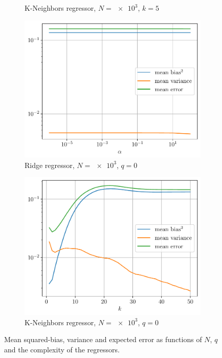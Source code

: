 \documentclass[a4paper, 12pt]{article}
\begin{document}
\begin{enumerate}[label=(\alph*)]
\begin{figure}[h]
\begin{subfigure}{0.48\textwidth}
                \caption{K-Neighbors regressor, $N = \num{e3}$, $k = 5$}
                \vspace{0.5em}
            \end{subfigure}
            \begin{subfigure}{0.48\textwidth}
                \includegraphics[width=\textwidth]{resources/pdf/rrg_mean_alpha.pdf}
                \caption{Ridge regressor, $N = \num{e3}$, $q = 0$}
            \end{subfigure}
            \begin{subfigure}{0.48\textwidth}
                \includegraphics[width=\textwidth]{resources/pdf/knr_mean_k.pdf}
                \caption{K-Neighbors regressor, $N = \num{e3}$, $q = 0$}
            \end{subfigure}
            \caption{Mean squared-bias, variance and expected error as functions of $N$, $q$ and the complexity of the regressors.}
            \label{fig:mean_error}
        \end{figure}
        

\end{enumerate}
\end{document}
